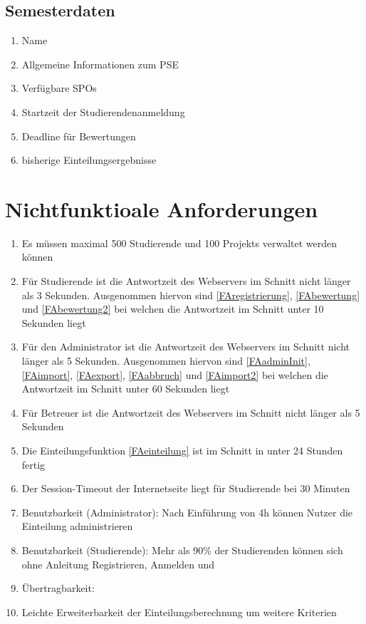 \documentclass[parskip=full]{scrartcl}
\newcommand{\swtLabel}[1]{\textbf{/#1\arabic*0/}}
\begin{document}
\subsection{Semesterdaten}
\begin{enumerate}[label=\swtLabel{D}, resume]
    \item Name
    \item Allgemeine Informationen zum \gls{PSE}
    \item Verfügbare \glspl{SPO}
    \item Startzeit der Studierendenanmeldung
    \item Deadline für Bewertungen
    \item bisherige Einteilungsergebnisse
\end{enumerate}

\section{Nichtfunktioale Anforderungen}

\begin{enumerate}[label=\swtLabel{NF}]
  \item Es müssen maximal 500 Studierende und 100 \glspl{Projekt} verwaltet werden
  können
  \item Für Studierende ist die Antwortzeit des Webservers im Schnitt nicht
  länger als 3 Sekunden. Ausgenommen hiervon sind \ref{FAregistrierung}, 
  \ref{FAbewertung} und \ref{FAbewertung2} bei welchen die Antwortzeit im
  Schnitt unter 10 Sekunden liegt
  \item Für den Administrator ist die Antwortzeit des Webservers im Schnitt nicht
  länger als 5 Sekunden. Ausgenommen hiervon sind \ref{FAadminInit}, \ref{FAimport},
  \ref{FAexport}, \ref{FAabbruch} und \ref{FAimport2} bei welchen die Antwortzeit im Schnitt
  unter 60 Sekunden liegt
  \item Für Betreuer ist die Antwortzeit des Webservers im Schnitt nicht
  länger als 5 Sekunden
  \item Die Einteilungsfunktion \ref{FAeinteilung} ist im Schnitt in unter 24
  Stunden fertig
	\item Der Session-Timeout der Internetseite liegt für Studierende bei 30
	Minuten
	\item Benutzbarkeit (Administrator): Nach Einführung von 4h können Nutzer die
	Einteilung administrieren
	\item Benutzbarkeit (Studierende): Mehr als 90\% der Studierenden können
	sich ohne Anleitung Registrieren, Anmelden und %
	\item Übertragbarkeit: %
	\item Leichte Erweiterbarkeit der Einteilungsberechnung um weitere Kriterien
	
 

\end{enumerate}
\end{document}
